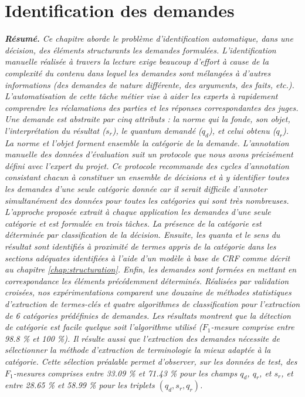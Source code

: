 \chapter{Identification des demandes}
\label{chap:quanta}

\textit{\small \textbf{Résumé.} Ce chapitre aborde le problème d'identification automatique, dans une décision, des éléments structurants les demandes formulées. L'identification manuelle réalisée à travers la lecture exige beaucoup d'effort à cause de la complexité du contenu dans lequel les demandes sont mélangées à d'autres informations (des demandes de nature différente, des arguments, des faits, etc.). L'automatisation de cette tâche métier vise à aider les experts à rapidement comprendre les réclamations des parties et les réponses correspondantes des juges. Une demande est abstraite par cinq attributs : la norme qui la fonde, son objet, l'interprétation du résultat ($s_r$), le quantum demandé ($q_d$), et celui obtenu ($q_r$). La norme et l'objet forment ensemble la catégorie de la demande. L'annotation manuelle des données d'évaluation suit un protocole que nous avons précisément défini avec l'expert du projet. Ce protocole recommande des cycles d'annotation consistant chacun à constituer un ensemble de décisions et à y identifier toutes les demandes d'une seule catégorie donnée car il serait difficile d'annoter simultanément des données pour toutes les catégories qui sont très nombreuses. L'approche proposée extrait à chaque application les demandes d'une seule catégorie et est formulée en trois tâches. La présence de la catégorie est déterminée par classification de la décision. Ensuite, les quanta et le sens du résultat sont identifiés à proximité de termes appris de la catégorie dans les sections adéquates identifiées à l'aide d'un modèle à base de CRF comme décrit au chapitre \ref{chap:structuration}. Enfin, les demandes sont formées en mettant en correspondance les éléments précédemment déterminés. Réalisées par validation croisées, nos expérimentations comparent une douzaine de méthodes statistiques d'extraction de termes-clés et quatre algorithmes de classification pour l'extraction de 6 catégories prédéfinies de demandes. Les résultats montrent que la détection de catégorie est facile quelque soit l'algorithme utilisé ($F_1$-mesure comprise entre 98.8 \% et 100 \%). Il résulte aussi que l'extraction des demandes nécessite de sélectionner la méthode d'extraction de terminologie la mieux adaptée à la catégorie. Cette sélection préalable permet d'observer, sur les données de test, des $F_1$-mesures comprises entre 33.09 \% et 71.43 \% pour les champs $q_d$, $q_r$, et $s_r$, et entre 28.65 \% et 58.99 \% pour les triplets $(q_d,s_r, q_r)$.}

